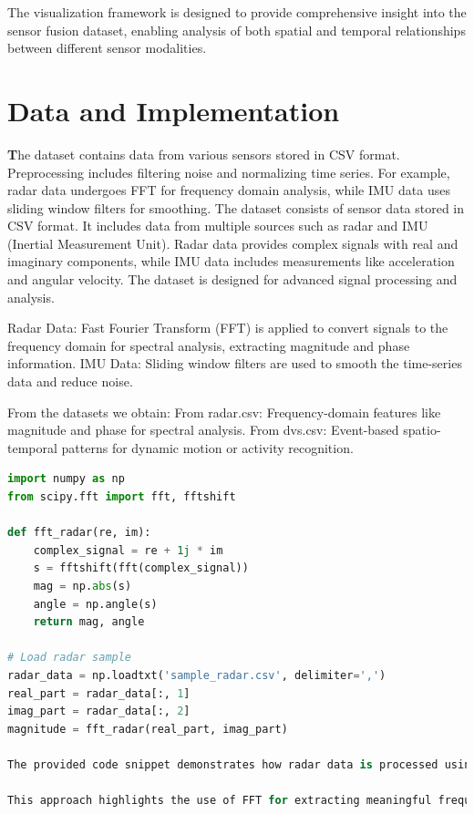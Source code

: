 \documentclass[12pt,a4paper]{article}
\begin{document}
The visualization framework is designed to provide comprehensive insight into the sensor fusion dataset, enabling analysis of both spatial and temporal relationships between different sensor modalities.
\section{Data and Implementation}
\textbf

The dataset contains data from various sensors stored in CSV format. Preprocessing includes filtering noise and normalizing time series. For example, radar data undergoes FFT for frequency domain analysis, while IMU data uses sliding window filters for smoothing.
The dataset consists of sensor data stored in CSV format. It includes data from multiple sources such as radar and IMU (Inertial Measurement Unit).
Radar data provides complex signals with real and imaginary components, while IMU data includes measurements like acceleration and angular velocity. The dataset is designed for advanced signal processing and analysis.

Radar Data: Fast Fourier Transform (FFT) is applied to convert signals to the frequency domain for spectral analysis, extracting magnitude and phase information.
IMU Data: Sliding window filters are used to smooth the time-series data and reduce noise.

From the datasets we obtain:
From radar.csv: Frequency-domain features like magnitude and phase for spectral analysis.
From dvs.csv: Event-based spatio-temporal patterns for dynamic motion or activity recognition.

\begin{lstlisting}[language=Python, caption=Radar Data undergoes FFT]
import numpy as np
from scipy.fft import fft, fftshift

def fft_radar(re, im):
    complex_signal = re + 1j * im
    s = fftshift(fft(complex_signal))
    mag = np.abs(s)
    angle = np.angle(s)
    return mag, angle

# Load radar sample
radar_data = np.loadtxt('sample_radar.csv', delimiter=',')
real_part = radar_data[:, 1]
imag_part = radar_data[:, 2]
magnitude = fft_radar(real_part, imag_part)

The provided code snippet demonstrates how radar data is processed using FFT. The real and imaginary components are loaded from the CSV file, transformed into the frequency domain, and combined to calculate the magnitude spectrum.

This approach highlights the use of FFT for extracting meaningful frequency-domain features from radar signals, which is crucial for further analysis.

\end{lstlisting}
\end{document}
